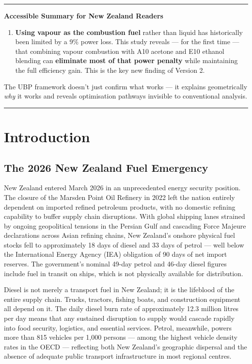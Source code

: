 \documentclass[12pt,a4paper]{article}
\newenvironment{accessibleenv}{%
  \vspace{8pt}\par%
  {\color{ubpblue}\rule{\linewidth}{2pt}}\par\vspace{2pt}%
  {\bfseries\large\color{ubpblue}Accessible Summary for New Zealand Readers}%
  \par\vspace{4pt}%
  \begin{list}{}{%
    \setlength{\leftmargin}{0.4cm}%
    \setlength{\rightmargin}{0.4cm}%
    \setlength{\listparindent}{0pt}%
    \setlength{\itemindent}{0pt}%
  }\item\relax%
}{%
  \end{list}%
  \par\vspace{2pt}%
  {\color{ubpblue}\rule{\linewidth}{2pt}}\par%
  \vspace{8pt}%
}
\begin{document}
\begin{accessibleenv}
\begin{enumerate}
  \item \textbf{Using vapour as the combustion fuel} rather than liquid has
  historically been limited by a 9\% power loss. This study reveals --- for the
  first time --- that combining vapour combustion with A10 acetone and E10 ethanol
  blending can \textbf{eliminate most of that power penalty} while maintaining the
  full efficiency gain. This is the key new finding of Version 2.
\end{enumerate}

The UBP framework doesn't just confirm what works --- it explains geometrically
\textit{why} it works and reveals optimisation pathways invisible to conventional
analysis.
\end{accessibleenv}

\newpage

\section{Introduction}

\subsection{The 2026 New Zealand Fuel Emergency}

New Zealand entered March 2026 in an unprecedented energy security position. The
closure of the Marsden Point Oil Refinery in 2022 left the nation entirely dependent
on imported refined petroleum products, with no domestic refining capability to buffer
supply chain disruptions. With global shipping lanes strained by ongoing geopolitical
tensions in the Persian Gulf and cascading Force Majeure declarations across Asian
refining chains, New Zealand's onshore physical fuel stocks fell to approximately 18
days of diesel and 33 days of petrol --- well below the International Energy Agency
(IEA) obligation of 90 days of net import reserves. The government's nominal 49-day
petrol and 46-day diesel figures include fuel in transit on ships, which is not
physically available for distribution.

Diesel is not merely a transport fuel in New Zealand; it is the lifeblood of the
entire supply chain. Trucks, tractors, fishing boats, and construction equipment all
depend on it. The daily diesel burn rate of approximately 12.3 million litres per day
means that any sustained disruption to supply would cascade rapidly into food security,
logistics, and essential services. Petrol, meanwhile, powers more than 815 vehicles per
1,000 persons --- among the highest vehicle density rates in the OECD --- reflecting
both New Zealand's geographic dispersal and the absence of adequate public transport
infrastructure in most regional centres.
\end{document}
